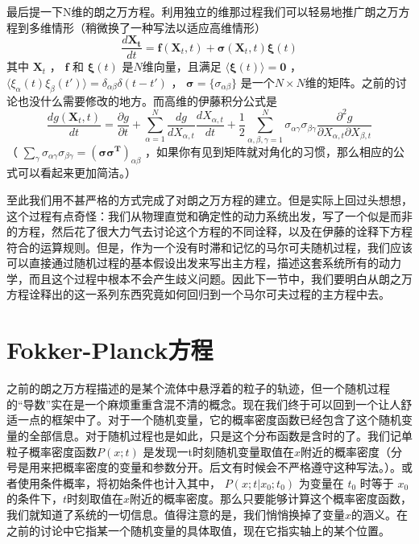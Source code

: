 \documentclass{ctexart}
\begin{document}
最后提一下N维的朗之万方程。利用独立的维那过程我们可以轻易地推广朗之万方程到多维情形（稍微换了一种写法以适应高维情形）
\begin{equation}
\frac{d \bm{X_t}}{dt}=\bm{f}(\bm{X}_t,t)+\bm{\sigma}(\bm{X}_t,t)\bm{\xi}(t)
\end{equation}
其中 $\bm{X}_t$ ， $\bm{f}$ 和 $\bm{\xi}(t)$ 是$N$维向量，且满足 $\langle\bm{\xi}(t)\rangle=\bm{0}$ ， $\langle\xi_\alpha(t)\xi_\beta(t')\rangle=\delta_{\alpha\beta}\delta(t-t')$ ， $\bm{\sigma}=\{\sigma_{\alpha\beta}\}$ 是一个$N\times N$维的矩阵。之前的讨论也没什么需要修改的地方。而高维的伊藤积分公式是
\begin{equation}
\frac{dg(\bm{X}_t,t)}{dt}=\frac{\partial g}{\partial t}+\sum_{\alpha=1}^N\frac{dg}{dX_{\alpha,t}}\frac{dX_{\alpha,t}}{dt}+\frac{1}{2}\sum_{\alpha,\beta,\gamma=1}^N\sigma_{\alpha\gamma}\sigma_{\beta\gamma}\frac{\partial^2 g}{\partial X_{\alpha, t}\partial X_{\beta,t}}
\end{equation}
（ $\sum_\gamma\sigma_{\alpha\gamma}\sigma_{\beta\gamma}=(\bm{\sigma\sigma^T})_{\alpha\beta}$ ，如果你有见到矩阵就对角化的习惯，那么相应的公式可以看起来更加简洁。）

至此我们用不甚严格的方式完成了对朗之万方程的建立。但是实际上回过头想想，这个过程有点奇怪：我们从物理直觉和确定性的动力系统出发，写了一个似是而非的方程，然后花了很大力气去讨论这个方程的不同诠释，以及在伊藤的诠释下方程符合的运算规则。但是，作为一个没有时滞和记忆的马尔可夫随机过程，我们应该可以直接通过随机过程的基本假设出发来写出主方程，描述这套系统所有的动力学，而且这个过程中根本不会产生歧义问题。因此下一节中，我们要明白从朗之万方程诠释出的这一系列东西究竟如何回归到一个马尔可夫过程的主方程中去。

\section{Fokker-Planck方程}

之前的朗之万方程描述的是某个流体中悬浮着的粒子的轨迹，但一个随机过程的“导数”实在是一个麻烦重重含混不清的概念。现在我们终于可以回到一个让人舒适一点的框架中了。对于一个随机变量，它的概率密度函数已经包含了这个随机变量的全部信息。对于随机过程也是如此，只是这个分布函数是含时的了。我们记单粒子概率密度函数$P(x;t)$ 是发现一t时刻随机变量取值在$x$附近的概率密度（分号是用来把概率密度的变量和参数分开。后文有时候会不严格遵守这种写法。）。或者使用条件概率，将初始条件也计入其中， $P(x;t|x_0;t_0)$ 为变量在 $t_0$ 时等于 $x_0$ 的条件下，$t$时刻取值在$x$附近的概率密度。那么只要能够计算这个概率密度函数，我们就知道了系统的一切信息。值得注意的是，我们悄悄换掉了变量$x$的涵义。在之前的讨论中它指某一个随机变量的具体取值，现在它指实轴上的某个位置。
\end{document}
